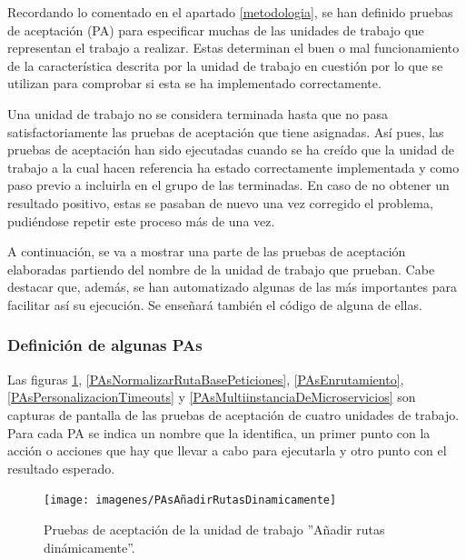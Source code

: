 \documentclass[11pt,spanish,listoffigures]{tfgetsinf}
\begin{document}
Recordando lo comentado en el apartado \ref{metodologia}, se han definido pruebas de aceptación (PA) para especificar muchas de las unidades de trabajo que representan el trabajo a realizar. Estas determinan el buen o mal funcionamiento de la característica descrita por la unidad de trabajo en cuestión por lo que se utilizan para comprobar si esta se ha implementado correctamente.

Una unidad de trabajo no se considera terminada hasta que no pasa satisfactoriamente las pruebas de aceptación que tiene asignadas. Así pues, las pruebas de aceptación han sido ejecutadas cuando se ha creído que la unidad de trabajo a la cual hacen referencia ha estado correctamente implementada y como paso previo a incluirla en el grupo de las terminadas. En caso de no obtener un resultado positivo, estas se pasaban de nuevo una vez corregido el problema, pudiéndose repetir este proceso más de una vez.

A continuación, se va a mostrar una parte de las pruebas de aceptación elaboradas partiendo del nombre de la unidad de trabajo que prueban. Cabe destacar que, además, se han automatizado algunas de las más importantes para facilitar así su ejecución. Se enseñará también el código de alguna de ellas.


			\subsubsection{Definición de algunas PAs}

Las figuras \ref{PAsAñadirRutasDinamicamente}, \ref{PAsNormalizarRutaBasePeticiones}, \ref{PAsEnrutamiento}, \ref{PAsPersonalizacionTimeouts} y \ref{PAsMultiinstanciaDeMicroservicios} son capturas de pantalla de las pruebas de aceptación de cuatro unidades de trabajo. Para cada PA se indica un nombre que la identifica, un primer punto con la acción o acciones que hay que llevar a cabo para ejecutarla y otro punto con el resultado esperado.

\begin{figure}[ht]
\centering
\texttt{[image: imagenes/PAsAñadirRutasDinamicamente]}
\caption{Pruebas de aceptación de la unidad de trabajo ''Añadir rutas dinámicamente''.}
	\label{PAsAñadirRutasDinamicamente}
\end{figure}
\end{document}
